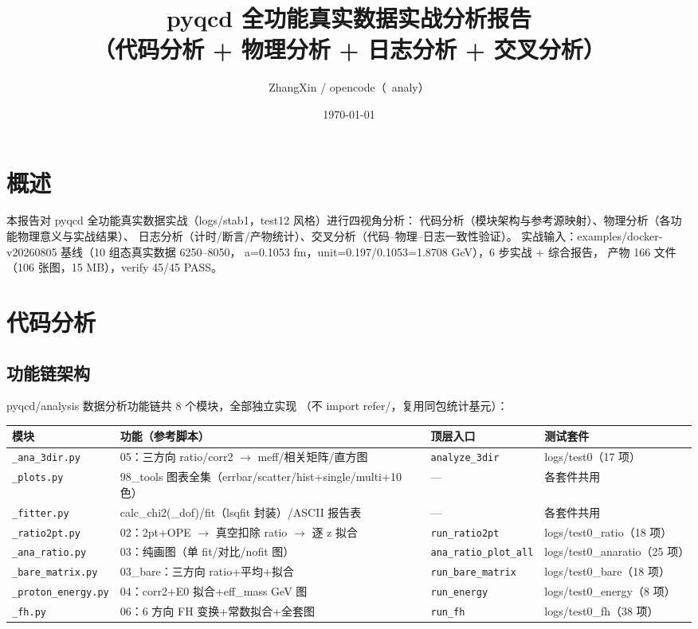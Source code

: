 \documentclass[11pt]{article}
\title{pyqcd 全功能真实数据实战分析报告\\（代码分析 + 物理分析 + 日志分析 + 交叉分析）}
\author{ZhangXin / opencode（~analy）}
\date{\today}
\begin{document}
\maketitle

\section{概述}
本报告对 pyqcd 全功能真实数据实战（logs/stab1，test12 风格）进行四视角分析：
代码分析（模块架构与参考源映射）、物理分析（各功能物理意义与实战结果）、
日志分析（计时/断言/产物统计）、交叉分析（代码--物理--日志一致性验证）。
实战输入：examples/docker-v20260805 基线（10 组态真实数据 6250--8050，
a=0.1053 fm，unit=0.197/0.1053=1.8708 GeV），6 步实战 + 综合报告，
产物 166 文件（106 张图，15 MB），verify 45/45 PASS。

\section{代码分析}
\subsection{功能链架构}
pyqcd/analysis 数据分析功能链共 8 个模块，全部独立实现
（不 import refer/，复用同包统计基元）：

\begin{longtable}{llll}
\hline
模块 & 功能（参考脚本） & 顶层入口 & 测试套件 \\
\hline
\texttt{\_ana\_3dir.py} & 05：三方向 ratio/corr2 $\rightarrow$ meff/相关矩阵/直方图 &
\texttt{analyze\_3dir} & logs/test0（17 项）\\
\texttt{\_plots.py} & 98\_tools 图表全集（errbar/scatter/hist+single/multi+10 色） & --- & 各套件共用 \\
\texttt{\_fitter.py} & calc\_chi2(\_dof)/fit（lsqfit 封装）/ASCII 报告表 & --- & 各套件共用 \\
\texttt{\_ratio2pt.py} & 02：2pt+OPE $\rightarrow$ 真空扣除 ratio $\rightarrow$ 逐 z 拟合 & \texttt{run\_ratio2pt} & logs/test0\_ratio（18 项） \\
\texttt{\_ana\_ratio.py} & 03：纯画图（单 fit/对比/nofit 图） & \texttt{ana\_ratio\_plot\_all} & logs/test0\_anaratio（25 项） \\
\texttt{\_bare\_matrix.py} & 03\_bare：三方向 ratio+平均+拟合 & \texttt{run\_bare\_matrix} & logs/test0\_bare（18 项） \\
\texttt{\_proton\_energy.py} & 04：corr2+E0 拟合+eff\_mass GeV 图 & \texttt{run\_energy} & logs/test0\_energy（8 项） \\
\texttt{\_fh.py} & 06：6 方向 FH 变换+常数拟合+全套图 & \texttt{run\_fh} & logs/test0\_fh（38 项） \\
\hline
\end{longtable}
\end{document}
